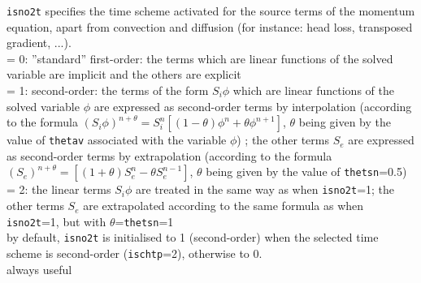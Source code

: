 {{\tt isno2t} specifies the time scheme activated
for the source terms of the momentum equation, apart from convection and
diffusion (for instance: head loss, transposed gradient, ...).\\
\hspace*{1.3cm}= 0: ''standard'' first-order: the terms which are linear
functions of the solved variable are implicit and the others are explicit\\
\hspace*{1.3cm}= 1: second-order: the terms of the form $S_i\phi$ which are
linear functions of the solved variable
$\phi$ are expressed as second-order terms by interpolation (according
to the formula
$(S_i\phi)^{n+\theta}=S_i^n[(1-\theta)\phi^n+\theta\phi^{n+1}]$, $\theta$
being given by the value of {\tt thetav} associated with the variable $\phi$)
; the other terms $S_e$ are expressed as second-order terms by
extrapolation (according to the formula
$(S_e)^{n+\theta}=[(1+\theta)S_e^n-\theta S_e^{n-1}]$, $\theta$ being
given by the value of {\tt thetsn}=0.5)\\
\hspace*{1.3cm}= 2: the linear terms $S_i\phi$ are treated in the same
way as when {\tt isno2t}=1;
the other terms $S_e$ are extrapolated according to the same formula
as when {\tt isno2t}=1, but with $\theta$={\tt thetsn}=1\\
by default, {\tt isno2t} is initialised to 1 (second-order) when
the selected time scheme is second-order ({\tt ischtp}=2), otherwise to 0.\\
always useful}

